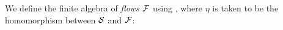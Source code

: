 
We define the finite algebra of \emph{flows} $\mathcal{F}$ using
, where $\eta$ is taken to be the
homomorphism between $\mathcal{S}$ and $\mathcal{F}$:

